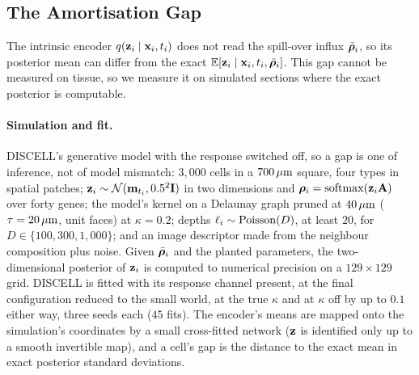 

\subsection{The Amortisation Gap}
\label{app:planted}

The intrinsic encoder $q(\mathbf{z}_i \mid \mathbf{x}_i, t_i)$ does not read the spill-over influx $\bar{\boldsymbol{\rho}}_i$, so its posterior mean can differ from the exact $\operatorname{\mathbb{E}}[\mathbf{z}_i \mid \mathbf{x}_i, t_i, \bar{\boldsymbol{\rho}}_i]$. This gap cannot be measured on tissue, so we measure it on simulated sections where the exact posterior is computable.

\paragraph{Simulation and fit.} DISCELL's generative model with the response switched off, so a gap is one of inference, not of model mismatch: $3{,}000$ cells in a $700\,\mu\text{m}$ square, four types in spatial patches; $\mathbf{z}_i \sim \mathcal{N}(\mathbf{m}_{t_i}, 0.5^2\mathbf{I})$ in two dimensions and $\boldsymbol{\rho}_i = \operatorname{softmax}(\mathbf{z}_i\mathbf{A})$ over forty genes; the model's kernel on a Delaunay graph pruned at $40\,\mu\text{m}$ ($\tau = 20\,\mu\text{m}$, unit faces) at $\kappa = 0.2$; depths $\ell_i \sim \operatorname{Poisson}(D)$, at least $20$, for $D \in \{100, 300, 1{,}000\}$; and an image descriptor made from the neighbour composition plus noise. Given $\bar{\boldsymbol{\rho}}_i$ and the planted parameters, the two-dimensional posterior of $\mathbf{z}_i$ is computed to numerical precision on a $129 \times 129$ grid. DISCELL is fitted with its response channel present, at the final configuration reduced to the small world, at the true $\kappa$ and at $\kappa$ off by up to $0.1$ either way, three seeds each ($45$ fits). The encoder's means are mapped onto the simulation's coordinates by a small cross-fitted network ($\mathbf{z}$ is identified only up to a smooth invertible map), and a cell's gap is the distance to the exact mean in exact posterior standard deviations.

